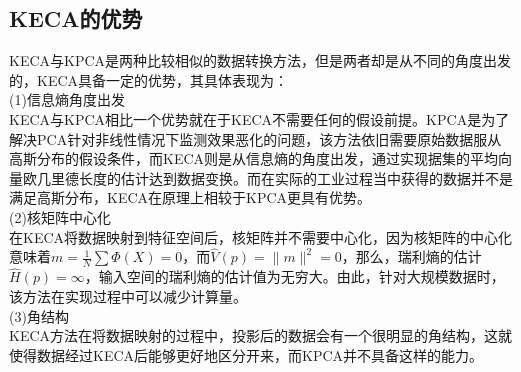 \subsection{KECA的优势}
KECA与KPCA是两种比较相似的数据转换方法，但是两者却是从不同的角度出发的，KECA具备一定的优势，其具体表现为：\\
(1)信息熵角度出发\\
KECA与KPCA相比一个优势就在于KECA不需要任何的假设前提。KPCA是为了解决PCA针对非线性情况下监测效果恶化的问题，该方法依旧需要原始数据服从高斯分布的假设条件，而KECA则是从信息熵的角度出发，通过实现据集的平均向量欧几里德长度的估计达到数据变换。而在实际的工业过程当中获得的数据并不是满足高斯分布，KECA在原理上相较于KPCA更具有优势。\\
(2)核矩阵中心化\\
在KECA将数据映射到特征空间后，核矩阵并不需要中心化，因为核矩阵的中心化意味着$m=\frac{1}{N}\sum\Phi(X)=0$，而$\hat{V}(p)=\|m\|^2=0$，那么，瑞利熵的估计$\hat{H}(p)=\infty$，输入空间的瑞利熵的估计值为无穷大。由此，针对大规模数据时，该方法在实现过程中可以减少计算量。\\
(3)角结构\\
KECA方法在将数据映射的过程中，投影后的数据会有一个很明显的角结构，这就使得数据经过KECA后能够更好地区分开来，而KPCA并不具备这样的能力。
